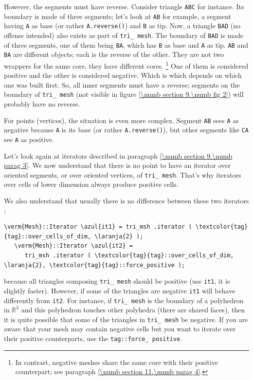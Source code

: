 However, the segments must have reverse.
Consider triangle {\small\tt ABC} for instance.
Its boundary is made of three segments; let's look at {\small\tt AB} for example,
a segment having {\small\tt A} as base (or rather {\small\tt A.reverse()}) and
{\small\tt B} as tip.
Now, a triangle {\small\tt BAD} (no offense intended) also exists as part of
{\small\tt tri\_\,mesh}.
The boundary of {\small\tt BAD} is made of three segments, one of them being {\small\tt BA},
which has {\small\tt B} as base and {\small\tt A} as tip.
{\small\tt AB} and {\small\tt BA} are different {\small\tt {}} objects;
each is the reverse of the other.
They are not two wrappers for the same core, they have different cores.%
\footnote {In contrast, negative meshes share the same core with their positive
counterpart; see paragraph \ref{\numb section 11.\numb parag 4}.}
One of them is considered positive and the other is considered negative.
Which is which depends on which one was built first.
So, all inner segments must have a reverse;
segments on the boundary of {\small\tt tri\_\,mesh} (not visible in figure
\ref{\numb section 9.\numb fig 2}) will probably have no reverse.

For points (vertices), the situation is even more complex.
Segment {\small\tt AB} sees {\small\tt A} as negative because {\small\tt A} is its base
(or rather {\small\tt A.reverse()}),
but other segments like {\small\tt CA} see {\small\tt A} as positive.

Let's look again at iterators described in paragraph \ref{\numb section 9.\numb parag 3}.
We now understand that there is no point to have an iterator over oriented
segments, or over oriented vertices, of {\small\tt tri\_\,mesh}.
That's why iterators over cells of lower dimension always produce positive cells.

We also understand that usually there is no difference between these two iterators :

\begin{Verbatim}[commandchars=\\\{\},formatcom=\small\tt,
   baselinestretch=0.94,framesep=2mm                      ]
   \verm{Mesh}::Iterator \azul{it1} = tri_msh .iterator ( \textcolor{tag}{tag}::over_cells_of_dim, \laranja{2} );
   \verm{Mesh}::Iterator \azul{it2} =
      tri_msh .iterator ( \textcolor{tag}{tag}::over_cells_of_dim, \laranja{2}, \textcolor{tag}{tag}::force_positive );
\end{Verbatim}

\noindent because all triangles composing {\small\tt tri\_\,mesh} should be positive
(use {\small\tt it1}, it is slightly faster).
However, if some of the triangles are negative {\small\tt it1} will behave differently from
{\small\tt it2}.
For instance, if {\small\tt tri\_\,mesh} is the boundary of a polyhedron in $ \mathbb{R}^3 $
and this polyhedron touches other polyhedra (there are shared faces), then it is
quite possible that some of the triangles in {\small\tt tri\_\,mesh} be negative.
If you are aware that your mesh may contain negative cells but
you want to iterate over their positive counterparts, use the {\small\tt \textcolor{tag}{tag}::force\_\,positive}.

